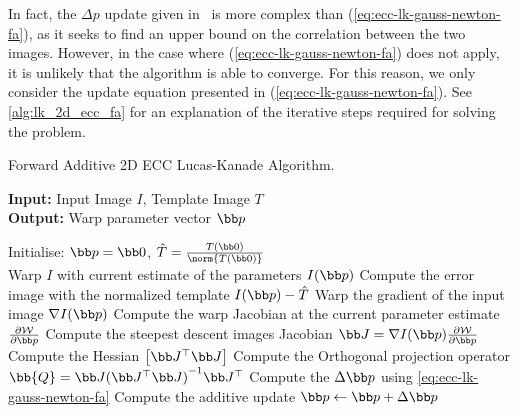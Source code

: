 In fact, the $\Delta p$ update given in~\cite{evangelidis2008parametric}
is more complex than
(\ref{eq:ecc-lk-gauss-newton-fa}), as it seeks to find an upper bound on the
correlation between the two images. However, in the case where
(\ref{eq:ecc-lk-gauss-newton-fa}) does not apply, it is unlikely that the
algorithm is able to converge. For this reason, we only consider the update
equation presented in (\ref{eq:ecc-lk-gauss-newton-fa}).
See \cref{alg:lk_2d_ecc_fa} for an explanation of the iterative steps required
for solving the problem.
\begin{algorithm}[t]
\caption{Forward Additive 2D ECC Lucas-Kanade Algorithm.}
\label{alg:lk_2d_ecc_fa}
    {\textbf{Input:} Input Image $I$, Template Image $T$} \\
    {\textbf{Output:} Warp parameter vector $\p$}  \\
    \begin{algorithmic}[1]
        \State{}Initialise: $\p = \zero$, $\hat{T} = \frac{T(\zero)}{\norm{T(\zero)}}$\\
        \While{$\norm{\Delta \p} > \epsilon$} %
            \State{}Warp $I$ with current estimate of the parameters $I(\p)$
            \State{}Compute the error image with the normalized template $I(\p) - \hat{T}$
            \State{}Warp the gradient of the input image $\nabla I(\p)$
            \State{}Compute the warp Jacobian at the current parameter estimate $\frac{\partial \mathcal{W}}{\partial \p}$
            \State{}Compute the steepest descent images Jacobian $\J = \nabla I(\p) \frac{\partial \mathcal{W}}{\partial \p}$
            \State{}Compute the Hessian $\left[ \J^{\top} \J \right]$
            \State{}Compute the Orthogonal projection operator $\bb{Q} = \J {(\J^\top
\J)}^{-1} \J^\top$
            \State{}Compute the $\Delta \p$ using \cref{eq:ecc-lk-gauss-newton-fa}
            \State{}Compute the additive update $\p \leftarrow \p + \Delta \p$
        \EndWhile{}
    \end{algorithmic}
\end{algorithm}
